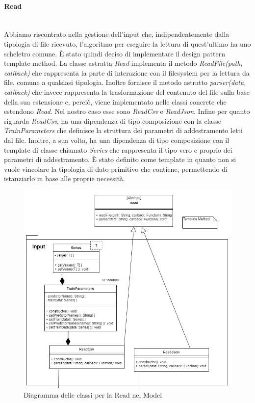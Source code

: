 		\paragraph*{Read} \mbox{} \\[1mm]
		Abbiamo riscontrato nella gestione dell'input che, indipendentemente dalla tipologia di file ricevuto, l'algoritmo per eseguire la lettura di quest'ultimo ha uno scheletro comune. È stato quindi deciso di implementare il design pattern template method.
		La classe astratta \textit{Read} implementa il metodo \textit{ReadFile(path, callback)} che rappresenta la parte di interazione con il filesystem per la lettura da file, comune a qualsiasi tipologia. Inoltre fornisce il metodo astratto \textit{parser(data, callback)} che invece rappresenta la trasformazione del contenuto del file sulla base della sua estensione e, perciò, viene implementato nelle classi concrete che estendono \textit{Read}. Nel nostro caso esse sono \textit{ReadCsv} e \textit{ReadJson}.
		Infine per quanto riguarda \textit{ReadCsv}, ha una dipendenza di tipo composizione con la classe \textit{TrainParameters} che definisce la struttura dei parametri di addestramento letti dal file. Inoltre, a sua volta, ha una dipendenza di tipo composizione con il template di classe chiamato \textit{Series} che rappresenta il tipo vero e proprio dei parametri di addestramento. È stato definito come template in quanto non si vuole vincolare la tipologia di dato primitivo che contiene, permettendo di istanziarlo in base alle proprie necessità.
		\mbox{}
				\begin{figure} [H]
					\includegraphics[width=\linewidth]{img/Diagrammi/read-app.png}
					\caption{Diagramma delle classi per la Read nel Model}
				\end{figure}
